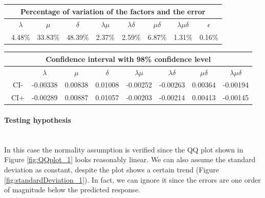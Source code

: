 \documentclass{article}
\begin{document}
                \begin{table}[htbp]
                    \centering 
                    \begin{tabular}{|c|c|c|c|c|c|c|c|}
                        \hline
                        \multicolumn{8}{|c|}{\bf Percentage of variation of the factors and the error} \\
                        \hline
                        \ $\lambda$ & $\mu$ & $\delta$ & $\lambda\mu$ & $\lambda\delta$ & $\mu\delta$ & $\lambda\mu\delta$ & $\epsilon$ \\
                        \hline
                        \ 4.48\% & 33.83\% & 48.39\% & 2.37\% & 2.59\% & 6.87\% & 1.31\% & 0.16\% \\ 
                        \hline
                    \end{tabular}
                    \label{table:variation_1}
                \end{table}
                
                \begin{table}[htbp]
                    \begin{tabular}{|c|c|c|c|c|c|c|c|}
                    
                         \hline
                         \multicolumn{8}{|c|}{\bf Confidence interval with 98\% confidence level} \\
                            
                        \hline
                        \ & $\lambda$ & $\mu$ & $\delta$ & $\lambda\mu$ & $\lambda\delta$ & $\mu\delta$ & $\lambda\mu\delta$\\
                        \hline
                        \ CI- & -0.00338 & 0.00838 & 0.01008 & -0.00252 & -0.00263 & 0.00364 & -0.00194 \\ 
                        \hline
                        \ CI+ & -0.00289 & 0.00887 & 0.01057 & -0.00203 & -0.00214 & 0.00413 & -0.00145 \\ 
                        \hline
                    \end{tabular}
                    \label{table:CI_1}
                \end{table}
            
            \paragraph{Testing hypothesis} \hfill \\
            In this case the normality assumption is verified since the QQ plot shown in Figure \ref{fig:QQplot_1} looks reasonably linear. 
            We can also assume the standard deviation as constant, despite the plot shows a certain trend (Figure \ref{fig:standardDeviation_1}). In fact, we can ignore it since the errors are one order of magnitude below the predicted response.
            
\end{document}
